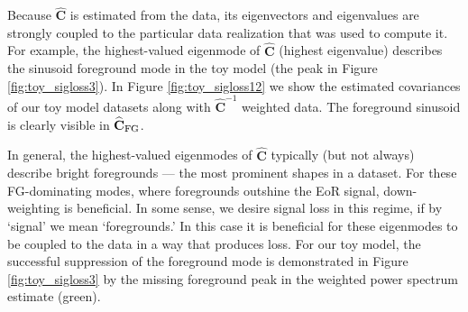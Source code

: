 \documentclass[preprint2,numberedappendix,tighten]{aastex6}
\begin{document}
Because $\widehat{\textbf{C}}$ is estimated from the data, its eigenvectors and eigenvalues are strongly coupled to the particular data realization that was used to compute it. For example, the highest-valued eigenmode of $\widehat{\textbf{C}}$ (highest eigenvalue) describes the sinusoid foreground mode in the toy model (the peak in Figure \ref{fig:toy_sigloss3}). In Figure \ref{fig:toy_sigloss12} we show the estimated covariances of our toy model datasets along with $\widehat{\textbf{C}}^{-1}$ weighted data. The foreground sinusoid is clearly visible in $\widehat{\textbf{C}}_{\rm FG}$.

In general, the highest-valued eigenmodes of $\widehat{\textbf{C}}$ typically (but not always) describe bright foregrounds --- the most prominent shapes in a dataset. For these FG-dominating modes, where foregrounds outshine the EoR signal, down-weighting is beneficial. In some sense, we desire signal loss in this regime, if by `signal' we mean `foregrounds.' In this case it is beneficial for these eigenmodes to be coupled to the data in a way that produces loss. For our toy model, the successful suppression of the foreground mode is demonstrated in Figure \ref{fig:toy_sigloss3} by the missing foreground peak in the weighted power spectrum estimate (green).

\end{document}
